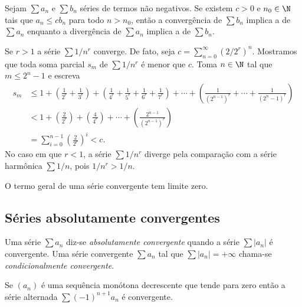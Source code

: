 \documentclass{article}
\begin{document}
\begin{thm} 
    Sejam \(\sum a_n\) e \(\sum b_n\) séries de termos não negativos. Se existem \(c>0\) e \(n_0 \in \N\) tais que \(a_n \leq c b_n\) para todo \(n>n_0\), então a convergência de \(\sum b_n\) implica a de \(\sum a_n\) enquanto a divergência de \(\sum a_n\) implica a de \(\sum b_n\).
\end{thm}

\begin{exmp} [p-série]
    Se \(r>1\) a série \(\sum 1/n^r\) converge. De fato, seja \(c = \sum_{n=0}^{\infty} (2/2^r)^n\). Mostramos que toda soma parcial \(s_m\) de \(\sum 1/n^r\) é menor que \(c\). Toma \(n \in \N\) tal que \(m \leq 2^n-1\) e escreva
    \begin{align*}
        s_m &\leq 1 + \left(\frac{1}{2^r} + \frac{1}{3^r}\right) + \left(\frac{1}{4^r}+\frac{1}{5^r}+\frac{1}{6^r}+\frac{1}{7^r}\right) + \cdots + \left(\frac{1}{(2^{n-1})^r} + \cdots + \frac{1}{(2^n-1)^r}\right)\\
        &< 1 + \left(\frac{2}{2^r}\right) + \left(\frac{4}{4^r}\right) + \cdots + \left(\frac{2^{n-1}}{(2^{n-1})^r}\right) \\
        &= \sum_{i=0}^{n-1} \left(\frac{2}{2^r}\right)^i < c.
    \end{align*}
    No caso em que \(r<1\), a série \(\sum 1/n^r\) diverge pela comparação com a série harmônica \(\sum 1/n\), pois \(1/n^r > 1/n\).
\end{exmp}

\begin{prop}
    O termo geral de uma série convergente tem limite zero.
\end{prop}

\subsection{Séries absolutamente convergentes}

\begin{defn}
    Uma série \(\sum a_n\) diz-se \emph{absolutamente convergente} quando a série \(\sum |a_n|\) é convergente.
    Uma série convergente \(\sum a_n\) tal que \(\sum |a_n| = +\infty\) chama-se \emph{condicionalmente convergente}.
\end{defn}

\begin{thm} [Leibniz]
    Se \((a_n)\) é uma sequência monótona decrescente que tende para zero então a série alternada \(\sum (-1)^{n+1} a_n\) é convergente.
\end{thm}
\end{document}
